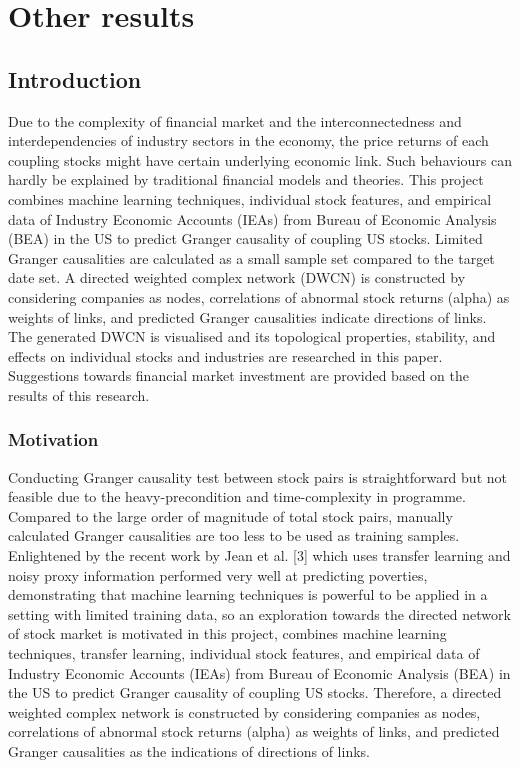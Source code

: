 \chapter{Other results}
\label{cpt:other}
\section{Introduction}
Due to the complexity of financial market and the interconnectedness and interdependencies of industry sectors in the economy, the price returns of each coupling stocks might have certain underlying economic link. Such behaviours can hardly be explained by traditional financial models and theories. This project combines machine learning techniques, individual stock features, and empirical data of Industry Economic Accounts (IEAs) from Bureau of Economic Analysis (BEA) in the US to predict Granger causality of coupling US stocks. Limited Granger causalities are calculated as a small sample set compared to the target date set. A directed weighted complex network (DWCN) is constructed by considering companies as nodes, correlations of abnormal stock returns (alpha) as weights of links, and predicted Granger causalities indicate directions of links. The generated DWCN is visualised and its topological properties, stability, and effects on individual stocks and industries are researched in this paper. Suggestions towards financial market investment are provided based on the results of this research.

\subsection{Motivation}
Conducting Granger causality test between stock pairs is straightforward but not feasible due to the heavy-precondition and time-complexity in programme. Compared to the large order of magnitude of total stock pairs, manually calculated Granger causalities are too less to be used as training samples. Enlightened by the recent work by Jean et al. [3] which uses transfer learning and noisy proxy information performed very well at predicting poverties, demonstrating that machine learning techniques is powerful to be applied in a setting with limited training data, so an exploration towards the directed network of stock market is motivated in this project, combines machine learning techniques, transfer learning, individual stock features, and empirical data of Industry Economic Accounts (IEAs) from Bureau of Economic Analysis (BEA) in the US to predict Granger causality of coupling US stocks. Therefore, a directed weighted complex network is constructed by considering companies as nodes, correlations of abnormal stock returns (alpha) as weights of links, and predicted Granger causalities as the indications of directions of links.

